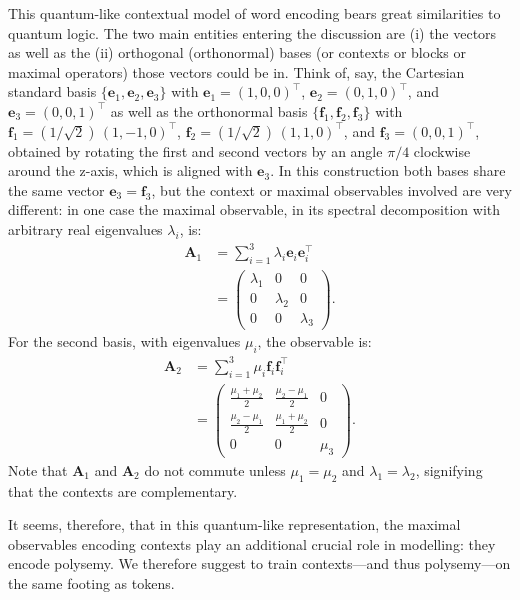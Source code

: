 \documentclass[%
  reprint,
  superscriptaddress,
  showpacs,
  showkeys,
  amsmath,amssymb,
  pra,
  longbibliography,
  floatfix,
  x11names
]{revtex4-2}
\begin{document}
This quantum-like contextual model of word encoding
bears great similarities to quantum logic.
The two main entities entering the discussion are
(i) the vectors as well as the
(ii) orthogonal (orthonormal) bases (or contexts or blocks or maximal operators) those vectors could be in.
Think of, say, the Cartesian standard basis $\{\bm{e}_1, \bm{e}_2, \bm{e}_3\}$ with
$\bm{e}_1= (1,0,0)^\intercal$, $\bm{e}_2=(0,1,0)^\intercal$, and $\bm{e}_3=(0,0,1)^\intercal$ as well as the orthonormal basis $\{\bm{f}_1, \bm{f}_2, \bm{f}_3\}$
with $\bm{f}_1=(1/\sqrt{2})\, (1 , -1  , 0)^\intercal$, $\bm{f}_2=(1/\sqrt{2})\,  (1 , 1 , 0)^\intercal$, and $\bm{f}_3=(0,0,1)^\intercal$, obtained by rotating the first and second vectors
by an angle $\pi/4$ clockwise around the z-axis, which is aligned with $\bm{e}_3$.
In this construction both bases share the same vector $\bm{e}_3 = \bm{f}_3$, but the context or maximal observables involved are very different:
in one case the maximal observable, in its spectral decomposition with arbitrary real eigenvalues $\lambda_i$, is:
\begin{align}
\bm{A}_1 &= \sum_{i=1}^3 \lambda_i \bm{e}_i \bm{e}_i^\intercal \\
&=
\begin{pmatrix}
\lambda_1 & 0 & 0 \\
0 & \lambda_2 & 0 \\
0 & 0 & \lambda_3
\end{pmatrix}.
\end{align}
For the second basis, with eigenvalues $\mu_i$, the observable is:
\begin{align}
\bm{A}_2 &= \sum_{i=1}^3 \mu_i \bm{f}_i \bm{f}_i^\intercal \\
&=
\begin{pmatrix}
\frac{\mu_1+\mu_2}{2} & \frac{\mu_2-\mu_1}{2} & 0 \\
\frac{\mu_2-\mu_1}{2} & \frac{\mu_1+\mu_2}{2} & 0 \\
0 & 0 & \mu_3
\end{pmatrix}.
\end{align}
Note that $\bm{A}_1$ and $\bm{A}_2$ do not commute unless $\mu_1=\mu_2$ and $\lambda_1=\lambda_2$, signifying that the contexts are complementary.

It seems, therefore, that in this quantum-like representation,
the maximal observables encoding contexts play an additional crucial role in modelling:
they encode polysemy.
We therefore suggest to train contexts---and thus polysemy---on the same footing as tokens.
\end{document}
